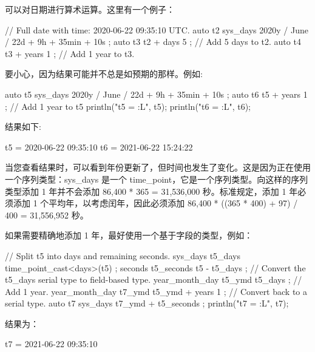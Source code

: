 可以对日期进行算术运算。这里有一个例子：

\begin{cpp}
// Full date with time: 2020-06-22 09:35:10 UTC.
auto t2 { sys_days { 2020y / June / 22d } + 9h + 35min + 10s };
auto t3 { t2 + days { 5 } }; // Add 5 days to t2.
auto t4 { t3 + years { 1 } }; // Add 1 year to t3.
\end{cpp}

要小心，因为结果可能并不总是如预期的那样。例如:

\begin{cpp}
auto t5 { sys_days { 2020y / June / 22d } + 9h + 35min + 10s };
auto t6 { t5 + years { 1 } }; // Add 1 year to t5
println("t5 = {:L}", t5);
println("t6 = {:L}", t6);
\end{cpp}

结果如下:

\begin{shell}
t5 = 2020-06-22 09:35:10
t6 = 2021-06-22 15:24:22
\end{shell}

当您查看结果时，可以看到年份更新了，但时间也发生了变化。这是因为正在使用一个序列类型：sys\_days 是一个 time\_point，它是一个序列类型。向这样的序列类型添加 1 年并不会添加 86,400 * 365 = 31,536,000 秒。标准规定，添加 1 年必须添加 1 个平均年，以考虑闰年，因此必须添加 86,400 * ((365 * 400) + 97) / 400 = 31,556,952 秒。

如果需要精确地添加 1 年，最好使用一个基于字段的类型，例如：

\begin{cpp}
// Split t5 into days and remaining seconds.
sys_days t5_days { time_point_cast<days>(t5) };
seconds t5_seconds { t5 - t5_days };
// Convert the t5_days serial type to field-based type.
year_month_day t5_ymd { t5_days };
// Add 1 year.
year_month_day t7_ymd { t5_ymd + years { 1 } };
// Convert back to a serial type.
auto t7 { sys_days { t7_ymd } + t5_seconds };
println("t7 = {:L}", t7);
\end{cpp}

结果为：

\begin{shell}
t7 = 2021-06-22 09:35:10
\end{shell}




